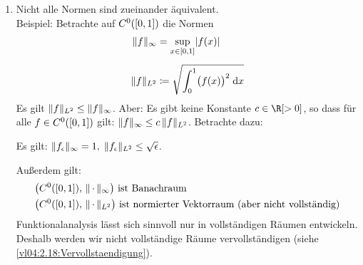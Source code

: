 \begin{thEmpty}
\begin{enumerate}[(1)]
    \item
        Nicht alle Normen sind zueinander äquivalent.\\
        Beispiel: Betrachte auf $C^0([0,1])$ die Normen
        \begin{align*}
            \lVert f\rVert_\infty &= \sup_{x\in[0,1]} \lvert f(x)\rvert  
            \\[1ex]
            \lVert f\rVert_{L^2} &\coloneqq \sqrt{ \int_0^1 \bigl(f(x)\bigr)^2 \;\mathrm{d} x }
        \end{align*}
        Es gilt $\lVert f\rVert_{L^2} \leq \lVert f\rVert_\infty$. Aber: Es gibt keine Konstante
        $c\in\R[>0]$, so dass für alle $f\in C^0([0,1])$ gilt: $\lVert f\rVert_\infty\leq
        c\,\lVert f\rVert_{L^2}$. Betrachte dazu:
        \begin{center}
            \pgfmathsetmacro{}
        \end{center}
        Es gilt: $\lVert f_\epsilon\rVert_\infty = 1,\; \lVert f_\epsilon\rVert_{L^2} \leq
        \sqrt{\epsilon}$.

        Außerdem gilt:
        \begin{align*}
            & \bigl( C^0([0,1]),\,\lVert\,\cdot\,\rVert_\infty \bigr)
            \text{ ist Banachraum}
            \\
            & \bigl( C^0([0,1]),\,\lVert\,\cdot\,\rVert_{L^2} \bigr)
            \text{ ist normierter Vektorraum (aber nicht vollständig)}
        \end{align*}
        Funktionalanalysis lässt sich sinnvoll nur in vollständigen Räumen
        entwickeln. Deshalb werden wir nicht vollständige Räume
        vervollständigen (siehe \cref{vl04:2.18:Vervollstaendigung}).
    \end{enumerate}
\end{thEmpty}


